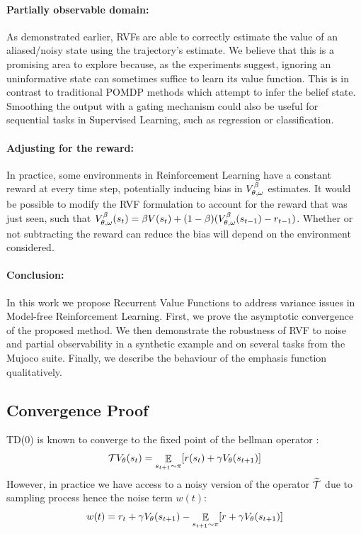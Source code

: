 \paragraph{Partially observable domain: } As demonstrated earlier, RVFs are able to correctly estimate the value of an aliased/noisy state using the trajectory's estimate. We believe that this is a promising area to explore because, as the experiments suggest, ignoring an uninformative state can sometimes suffice to learn its value function. This is in contrast to traditional POMDP methods which attempt to infer the belief state. Smoothing the output with a gating mechanism could also be useful for sequential tasks in Supervised Learning, such as regression or classification. 
\paragraph{Adjusting for the reward:} In practice, some environments in Reinforcement Learning have
a constant reward at every time step, potentially inducing bias in $V^{\beta}_{\theta, \omega}$ estimates. It would be possible to modify the RVF formulation to account for the reward that was just seen, such that $V^{\beta}_{\theta, \omega}(s_t) = \beta V(s_t) + (1-\beta) (V^{\beta}_{\theta, \omega}(s_{t-1}) - r_{t-1})$.
Whether or not subtracting the reward can reduce the bias will depend on the environment considered.
\paragraph{Conclusion:} In this work we propose Recurrent Value Functions to address variance issues in Model-free Reinforcement Learning. First, we prove the asymptotic convergence of the proposed method. We then demonstrate the robustness of RVF to noise and partial observability in a synthetic example and on several tasks from the Mujoco suite. Finally, we describe the behaviour of the emphasis function qualitatively.

\subsection{Convergence Proof}
TD(0) is known to converge to the fixed point of the bellman operator \cite{sutton1988learning}:
\begin{equation}
\begin{split}
    \mathcal{T} V_{\theta}(s_t) &= \mathop{\mathbb{E}}_{s_{t+1} \sim \pi} [r(s_t) + \gamma V_{\theta}(s_{t+1})]\\
\end{split}
\end{equation}
However, in practice we have access to a noisy version of the operator $\widetilde{\mathcal{T}}$ due to sampling process hence the noise term $w(t)$:
\begin{equation}
    w(t) = r_t + \gamma V_{\theta} (s_{t+1}) - \mathop{\mathbb{E}}_{s_{t+1} \sim \pi} [r + \gamma V_{\theta}(s_{t+1})]
\end{equation}
